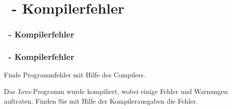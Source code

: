 \def\stitle{\theexercise\ - Kompilerfehler}
\section{\stitle}
\begin{frame}
  \frametitle{\stitle}%
\tableofcontents[current]
\end{frame}


\begin{frame}[t]%
\frametitle{\stitle}

Finde Programmfehler mit Hilfe des Compilers.

Das Java-Programm  wurde kompiliert, wobei einige Fehler und Warnungen auftraten.
Finden Sie mit Hilfe der Kompilerausgaben die Fehler.

 \end{frame}
